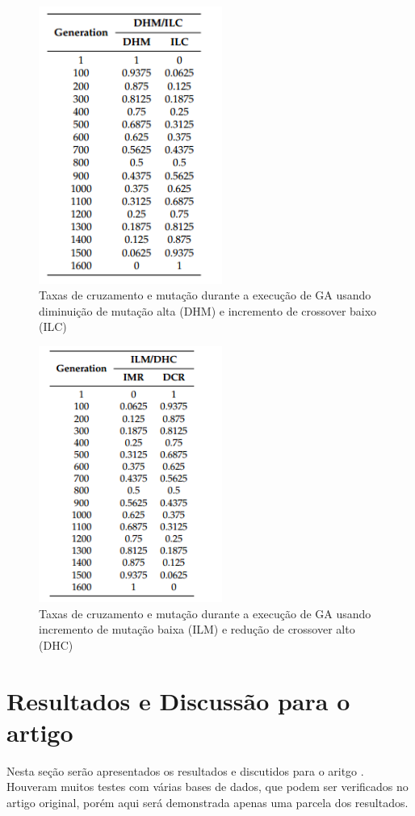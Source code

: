 \documentclass[conference]{IEEEtran}
\begin{document}
\begin{figure}[ht]
\centering
\includegraphics[width=6cm]{m-c_dhm-ilc.png}
\caption{\label{img:m-c_dhm-ilc} Taxas de cruzamento e mutação durante a execução de GA usando diminuição de mutação alta (DHM) e incremento de crossover baixo (ILC) } 
\end{figure}

\begin{figure}[ht]
\centering
\includegraphics[width=6cm]{m-c_ilm-dhc.png}
\caption{\label{img:m-c_ilm-dhc} Taxas de cruzamento e mutação durante a execução de GA usando incremento de mutação baixa (ILM) e redução de crossover alto (DHC) } 
\end{figure}



\section{Resultados e Discussão para o artigo \cite{m-c}}
Nesta seção serão apresentados os resultados e discutidos para o aritgo \cite{m-c}. Houveram muitos testes com várias bases de dados, que podem ser verificados no artigo original, porém aqui será demonstrada apenas uma parcela dos resultados. 
\end{document}
